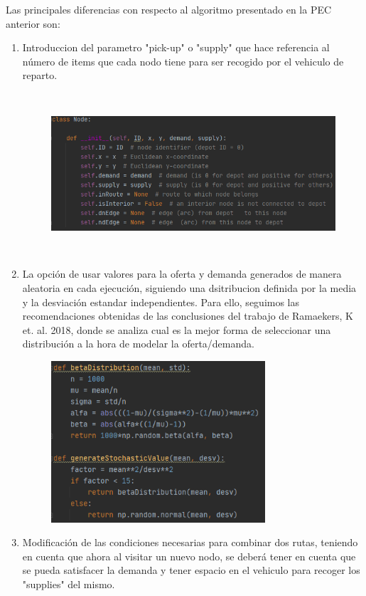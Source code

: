 \documentclass[11pt]{article} %
\begin{document}
\begin{enumerate}
Las principales diferencias con respecto al algoritmo presentado en la PEC anterior son:
\begin{enumerate}
\item Introduccion del parametro "pick-up" o "supply" que hace referencia al número de items que cada nodo tiene para ser recogido por el vehiculo de reparto.
\begin{figure}[H]
\centering
\includegraphics[width=\linewidth, height=6cm]{Node.png} 
\end{figure}
\item La opción de usar valores para la oferta y demanda generados de manera aleatoria en cada ejecución, siguiendo una dsitribucion definida por la media y la desviación estandar independientes. Para ello, seguimos las recomendaciones obtenidas de las conclusiones del trabajo de Ramaekers, K et. al. 2018, donde se analiza cual es la mejor forma de seleccionar una distribución a la hora de modelar la oferta/demanda. 
\begin{figure}[H]
\centering
\includegraphics[width=0.55\linewidth, height=6cm]{StochDistrib.png} 
\end{figure}
\item Modificación de las condiciones necesarias para combinar dos rutas, teniendo en cuenta que ahora al visitar un nuevo nodo, se deberá tener en cuenta que se pueda satisfacer la demanda y tener espacio en el vehiculo para recoger los "supplies" del mismo.

\end{enumerate}
\end{enumerate}
\end{document}
